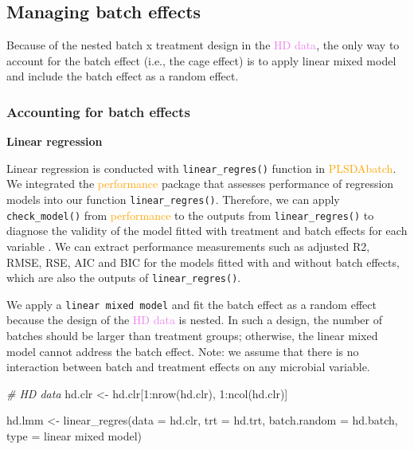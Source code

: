 \documentclass[
]{book}
\newenvironment{Shaded}{\begin{snugshade}}{\end{snugshade}}
\newcommand{\AttributeTok}[1]{\textcolor[rgb]{0.77,0.63,0.00}{#1}}
\newcommand{\CommentTok}[1]{\textcolor[rgb]{0.56,0.35,0.01}{\textit{#1}}}
\newcommand{\DecValTok}[1]{\textcolor[rgb]{0.00,0.00,0.81}{#1}}
\newcommand{\FunctionTok}[1]{\textcolor[rgb]{0.00,0.00,0.00}{#1}}
\newcommand{\NormalTok}[1]{#1}
\newcommand{\OtherTok}[1]{\textcolor[rgb]{0.56,0.35,0.01}{#1}}
\newcommand{\SpecialCharTok}[1]{\textcolor[rgb]{0.00,0.00,0.00}{#1}}
\newcommand{\StringTok}[1]{\textcolor[rgb]{0.31,0.60,0.02}{#1}}
\begin{document}
\hypertarget{managing-batch-effects-3}{%
\subsection{Managing batch effects}\label{managing-batch-effects-3}}

Because of the nested batch x treatment design in the \textcolor{violet}{HD data}, the only way to account for the batch effect (i.e., the cage effect) is to apply linear mixed model and include the batch effect as a random effect.

\hypertarget{accounting-for-batch-effects-2}{%
\subsubsection{Accounting for batch effects}\label{accounting-for-batch-effects-2}}

\textbf{Linear regression}

Linear regression is conducted with \texttt{linear\_regres()} function in \textcolor{orange}{PLSDAbatch}. We integrated the \textcolor{orange}{performance} package that assesses performance of regression models into our function \texttt{linear\_regres()}. Therefore, we can apply \texttt{check\_model()} from \textcolor{orange}{performance} to the outputs from \texttt{linear\_regres()} to diagnose the validity of the model fitted with treatment and batch effects for each variable \citep{daniel2020performance}. We can extract performance measurements such as adjusted R2, RMSE, RSE, AIC and BIC for the models fitted with and without batch effects, which are also the outputs of \texttt{linear\_regres()}.

We apply a \texttt{linear\ mixed\ model} and fit the batch effect as a random effect because the design of the \textcolor{violet}{HD data} is nested. In such a design, the number of batches should be larger than treatment groups; otherwise, the linear mixed model cannot address the batch effect. Note: we assume that there is no interaction between batch and treatment effects on any microbial variable.

\begin{Shaded}
\begin{Highlighting}[]
\CommentTok{\# HD data}
\NormalTok{hd.clr }\OtherTok{\textless{}{-}}\NormalTok{ hd.clr[}\DecValTok{1}\SpecialCharTok{:}\FunctionTok{nrow}\NormalTok{(hd.clr), }\DecValTok{1}\SpecialCharTok{:}\FunctionTok{ncol}\NormalTok{(hd.clr)]}

\NormalTok{hd.lmm }\OtherTok{\textless{}{-}} \FunctionTok{linear\_regres}\NormalTok{(}\AttributeTok{data =}\NormalTok{ hd.clr, }\AttributeTok{trt =}\NormalTok{ hd.trt, }
                        \AttributeTok{batch.random =}\NormalTok{ hd.batch, }
                        \AttributeTok{type =} \StringTok{\textquotesingle{}linear mixed model\textquotesingle{}}\NormalTok{)}
\end{Highlighting}
\end{Shaded}
\end{document}
